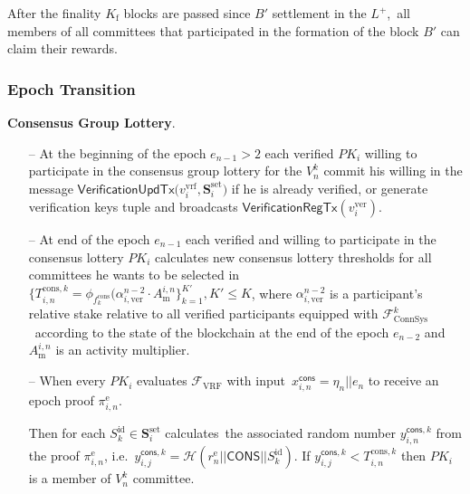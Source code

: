 \begin{legal}
    \item After the finality $K_{\text{f}}$ blocks are passed since $B'$ settlement in the $L^+$,\
    all members of all committees that participated in the formation of the block $B'$ can claim their rewards.

\end{legal}

\subsubsection{Epoch Transition}\label{subsubsec:epoch-transition}
\begin{legal}
    \item \textbf{Consensus Group Lottery}.
    \begin{itemize}
        \item [--] At the beginning of the epoch ${e_{n-1} > 2}$ each verified $PK_i$ willing to participate in the
        consensus group lottery for the $V^k_n$ commit his willing in the message $\textsf{VerificationUpdTx(}v_i^{\text{vrf}}, \mathbf{S}_i^{\text{set}}\textsf{)}$
        if he is already verified, or generate verification keys tuple and broadcasts $\textsf{VerificationRegTx}(v_i^{\text{ver}})$.
        \item[--] At end of the epoch $e_{n-1}$ each verified and willing to participate in the consensus lottery $PK_i$
        calculates new consensus lottery thresholds for all committees he wants to be selected in \
        $\{T_{i, n}^{\text{cons}, k} = \phi_{f^{\text{cons}}_k}(\alpha^{n-2}_{i, \text{ver}} \cdot A^{i, n}_{\text{m}}\}_{k=1}^{K'}, K' \leq K$,
        where $\alpha^{n-2}_{i, \text{ver}}$ is a participant's relative stake relative to all verified participants equipped with $\mathcal{F}^k_{\text{ConnSys}}$\
        according to the state of the blockchain at the end of the epoch $e_{n-2}$ and $A^{i, n}_{\text{m}}$ is an activity multiplier.
        \item [--] When every $PK_i$ evaluates ${\mathcal{F}}_{\text{VRF}}$ with input\
        $x_{i, n}^{\textsf{cons}} = \eta_n || e_n $ to receive an epoch proof $\pi_{i, n}^{\text{e}}$.

        \bigskip
        Then for each $S_k^{\text{id}}\in \mathbf{S}_i^{\text{set}}$ calculates\
        the associated random number $y_{i, n}^{\textsf{cons}, k}$ from the proof $\pi_{i, n}^{\text{e}}$, i.e.\
        ${y_{i, j}^{\textsf{cons}, k} = \mathcal{H}(r_{n}^{\text{e}}||\textsf{CONS}||S_k^{\text{id}})}$.
        If $y_{i, j}^{\textsf{cons}, k} < T_{i, n}^{\text{cons}, k}$ then $PK_i$ is a member of $V^k_{n}$ committee.


\end{itemize}
\end{legal}
